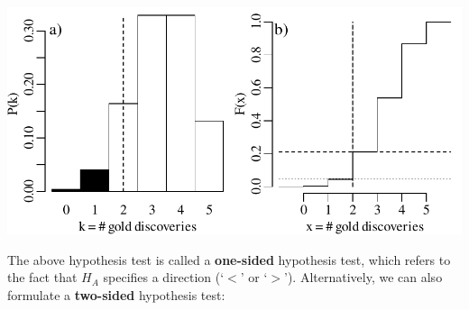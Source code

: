 \noindent\begin{minipage}[t][][b]{.6\textwidth}
\includegraphics[width=\textwidth]{../figures/1sidedbinomialrejection5.pdf}
\medskip
\end{minipage}
\begin{minipage}[t][][t]{.4\textwidth}
  \label{fig:1sidedbinomialrejection5}
\end{minipage}

The above hypothesis test is called a \textbf{one-sided} hypothesis
test, which refers to the fact that $H_{\!A}$ specifies a direction
(`$<$' or `$>$').  Alternatively, we can also formulate a
\textbf{two-sided} hypothesis test:

